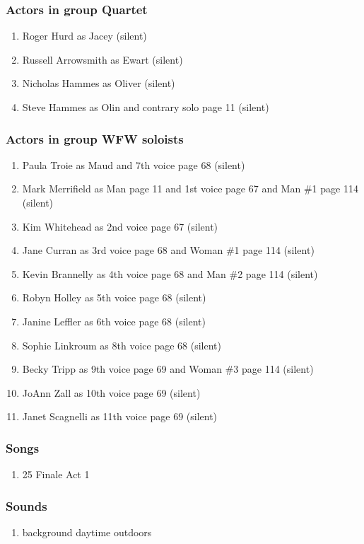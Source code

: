 \subsubsection{Actors in group Quartet}
\begin{enumerate}
\item Roger Hurd as Jacey (silent)
\item Russell Arrowsmith as Ewart (silent)
\item Nicholas Hammes as Oliver (silent)
\item Steve Hammes as Olin and contrary solo page 11 (silent)
\end{enumerate}
\subsubsection{Actors in group WFW soloists}
\begin{enumerate}
\item Paula Troie as Maud and 7th voice page 68 (silent)
\item Mark Merrifield as Man page 11 and 1st voice page 67 and Man \#1 page 114 (silent)
\item Kim Whitehead as 2nd voice page 67 (silent)
\item Jane Curran as 3rd voice page 68 and Woman \#1 page 114 (silent)
\item Kevin Brannelly as 4th voice page 68 and Man \#2 page 114 (silent)
\item Robyn Holley as 5th voice page 68 (silent)
\item Janine Leffler as 6th voice page 68 (silent)
\item Sophie Linkroum as 8th voice page 68 (silent)
\item Becky Tripp as 9th voice page 69 and Woman \#3 page 114 (silent)
\item JoAnn Zall as 10th voice page 69 (silent)
\item Janet Scagnelli as 11th voice page 69 (silent)
\end{enumerate}

\subsubsection{Songs}
\begin{enumerate}
\item 25 Finale Act 1
\end{enumerate}\subsubsection{Sounds}
\begin{enumerate}
\item background daytime outdoors
\end{enumerate}
